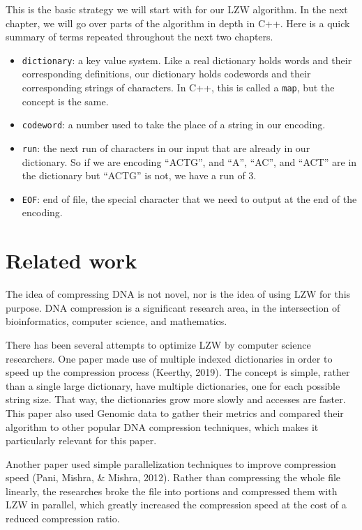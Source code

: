 \documentclass[12pt,twoside]{reedthesis}
\providecommand{\tightlist}{%
  \setlength{\itemsep}{0pt}\setlength{\parskip}{0pt}}
\begin{document}
This is the basic strategy we will start with for our LZW algorithm. In the next chapter, we will go over parts of the algorithm in depth in C++. Here is a quick summary of terms repeated throughout the next two chapters.
\begin{itemize}
\tightlist
\item
  \texttt{dictionary}: a key value system. Like a real dictionary holds words and their corresponding definitions, our dictionary holds codewords and their corresponding strings of characters. In C++, this is called a \texttt{map}, but the concept is the same.
\item
  \texttt{codeword}: a number used to take the place of a string in our encoding.
\item
  \texttt{run}: the next run of characters in our input that are already in our dictionary. So if we are encoding ``ACTG'', and ``A'', ``AC'', and ``ACT'' are in the dictionary but ``ACTG'' is not, we have a run of 3.
\item
  \texttt{EOF}: end of file, the special character that we need to output at the end of the encoding.
\end{itemize}
\hypertarget{related-work}{%
\section{Related work}\label{related-work}}

The idea of compressing DNA is not novel, nor is the idea of using LZW for this purpose. DNA compression is a significant research area, in the intersection of bioinformatics, computer science, and mathematics.

There has been several attempts to optimize LZW by computer science researchers. One paper made use of multiple indexed dictionaries in order to speed up the compression process (Keerthy, 2019). The concept is simple, rather than a single large dictionary, have multiple dictionaries, one for each possible string size. That way, the dictionaries grow more slowly and accesses are faster. This paper also used Genomic data to gather their metrics and compared their algorithm to other popular DNA compression techniques, which makes it particularly relevant for this paper.

Another paper used simple parallelization techniques to improve compression speed (Pani, Mishra, \& Mishra, 2012). Rather than compressing the whole file linearly, the researches broke the file into portions and compressed them with LZW in parallel, which greatly increased the compression speed at the cost of a reduced compression ratio.
\end{document}
